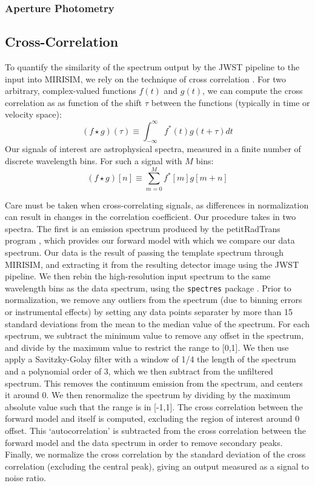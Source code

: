 \subsubsection{Aperture Photometry}
\subsection{Cross-Correlation}
To quantify the similarity of the spectrum output by the JWST pipeline to the input into MIRISIM, we rely on the technique of cross correlation \cite{}.
For two arbitrary, complex-valued functions $f(t)$ and $g(t)$, we can compute the cross correlation as as function of the shift $\tau$ between the functions (typically in time or velocity space):
\begin{equation}\label{eqn:crosscorr}
\left(f \star g\right)(\tau) \equiv \int_{-\infty}^{\infty}f^{*}(t)g(t + \tau)dt
\end{equation}
Our signals of interest are astrophysical spectra, measured in a finite number of discrete wavelength bins. For such a signal with $M$ bins:
\begin{equation}\label{eqn:discretecorr}
\left(f \star g\right)[n] \equiv \sum_{m=0}^{M}f^{*}[m]g[m + n]
\end{equation}

Care must be taken when cross-correlating signals, as differences in normalization can result in changes in the correlation coefficient. 
Our procedure takes in two spectra. 
The first is an emission spectrum produced by the petitRadTrans program \cite{Molliere2019}, which provides our forward model with which we compare our data spectrum.
Our data is the result of passing the template spectrum through MIRISIM, and extracting it from the resulting detector image using the JWST pipeline.
We then rebin the high-resolution input spectrum to the same wavelength bins as the data spectrum, using the \verb|spectres| package \cite{}.
Prior to normalization, we remove any outliers from the spectrum (due to binning errors or instrumental effects) by setting any data points separater by more than 15 standard deviations from the mean to the median value of the spectrum.
For each spectrum, we subtract the minimum value to remove any offset in the spectrum, and divide by the maximum value to restrict the range to [0,1]. 
We then use apply a Savitzky-Golay filter with a window of 1/4 the length of the spectrum and a polynomial order of 3, which we then subtract from the unfiltered spectrum. 
This removes the continuum emission from the spectrum, and centers it around 0.
We then renormalize the spectrum by dividing by the maximum absolute value such that the range is in [-1,1]. 
The cross correlation between the forward model and itself is computed, excluding the region of interest around 0 offset. 
This `autocorrelation' is subtracted from the cross correlation between the forward model and the data spectrum in order to remove secondary peaks.
Finally, we normalize the cross correlation by the standard deviation of the cross correlation (excluding the central peak), giving an output measured as a signal to noise ratio.

